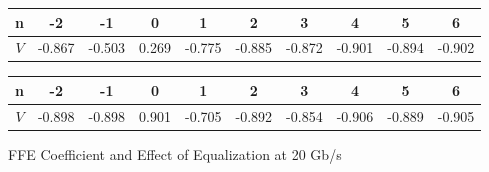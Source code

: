 \documentclass{book}  %
\begin{document}
\begin{paper}
\begin{figure}
	\begin{minipage}[tb]{\textwidth}
		\centering	
		\begin{tabular}{|c|c|c|c|c|c|c|c|c|c|}\hline
			n  &   -2   &   -1   &   0   &    1   &    2   &    3   &    4   &    5   &    6   \\ \hline 
			$V$ & -0.867 & -0.503 & 0.269 & -0.775 & -0.885 & -0.872 & -0.901 & -0.894 & -0.902 \\ \hline 
		\end{tabular}
		\label{table:20G_rxdiff_sample_wo_FFE}
	\end{minipage}	
	\begin{minipage}[tb]{\textwidth}
		\centering	
		\begin{tabular}{|c|c|c|c|c|c|c|c|c|c|}\hline
			n  &   -2   &   -1   &   0   &    1   &    2   &    3   &    4   &    5   &    6   \\ \hline 
			$V$ & -0.898 & -0.898 & 0.901 & -0.705 & -0.892 & -0.854 & -0.906 & -0.889 & -0.905 \\ \hline 
		\end{tabular}
		\label{table:20G_rxdiff_sample_w__FFE} 
	\end{minipage}
	\caption{FFE Coefficient and Effect of Equalization at 20 Gb/s}
\end{figure}


\end{paper}
\end{document}
